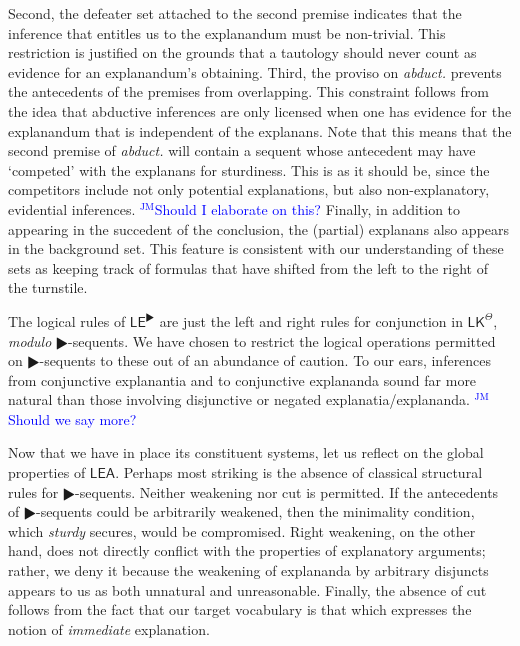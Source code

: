 \documentclass{article}
\theoremstyle{definition}
\theoremstyle{definition}
\theoremstyle{definition}
\theoremstyle{definition}
\theoremstyle{remark}
\theoremstyle{definition}
\theoremstyle{definition}
\newcommand{\jm}[1]{\textcolor{blue}{$^{\textrm{JM}}${#1}}}
\begin{document}
Second, the defeater set attached to the second premise indicates that the inference that entitles us to the explanandum must be non-trivial. This restriction is justified on the grounds that a tautology should never count as evidence for an explanandum's obtaining.  Third, the proviso on \textit{abduct.} prevents the antecedents of the premises from overlapping. This constraint follows from the idea that abductive inferences are only licensed when one has evidence for the explanandum that is independent of the explanans. Note that this means that the second premise of \textit{abduct.} will contain a sequent whose antecedent may have `competed' with the explanans for sturdiness. This is as it should be, since the competitors include not only potential explanations, but also non-explanatory, evidential inferences. \jm{Should I elaborate on this?} Finally, in addition to appearing in the succedent of the conclusion, the (partial) explanans also appears in the background set. This feature is consistent with our understanding of these sets as keeping track of formulas that have shifted from the left to the right of the turnstile.




The logical rules of $ \mathsf{LE}^\RHD $ are just the left and right rules for conjunction in $\mathsf{LK^\Theta}$, \textit{modulo} $ \RHD$-sequents. We have chosen to restrict the logical operations permitted on $ \RHD$-sequents to these out of an abundance of caution. To our ears, inferences from conjunctive explanantia and to conjunctive explananda sound far more natural than those involving disjunctive or negated explanatia/explananda. \jm{Should we say more?}

Now that we have in place its constituent systems, let us reflect on the global properties of  $ \mathsf{LEA}$. Perhaps most striking is the absence of classical structural rules for $ \RHD$-sequents. Neither weakening nor cut is permitted. If the antecedents of $ \RHD $-sequents could be arbitrarily weakened, then the minimality condition, which \textit{sturdy} secures, would be compromised. Right weakening, on the other hand, does not directly conflict with the properties of explanatory arguments; rather, we deny it because the weakening of explananda by arbitrary disjuncts appears to us as both unnatural and unreasonable. Finally, the absence of cut follows from the fact that our target vocabulary is that which expresses the notion of \textit{immediate} explanation.
\end{document}
